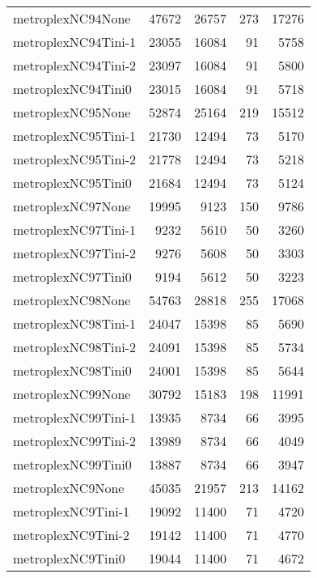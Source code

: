 \begin{longtable}{lrrrr}
metroplexNC94None & 47672 & 26757 & 273 & 17276 \\
metroplexNC94Tini-1 & 23055 & 16084 & 91 & 5758 \\
metroplexNC94Tini-2 & 23097 & 16084 & 91 & 5800 \\
metroplexNC94Tini0 & 23015 & 16084 & 91 & 5718 \\
metroplexNC95None & 52874 & 25164 & 219 & 15512 \\
metroplexNC95Tini-1 & 21730 & 12494 & 73 & 5170 \\
metroplexNC95Tini-2 & 21778 & 12494 & 73 & 5218 \\
metroplexNC95Tini0 & 21684 & 12494 & 73 & 5124 \\
metroplexNC97None & 19995 & 9123 & 150 & 9786 \\
metroplexNC97Tini-1 & 9232 & 5610 & 50 & 3260 \\
metroplexNC97Tini-2 & 9276 & 5608 & 50 & 3303 \\
metroplexNC97Tini0 & 9194 & 5612 & 50 & 3223 \\
metroplexNC98None & 54763 & 28818 & 255 & 17068 \\
metroplexNC98Tini-1 & 24047 & 15398 & 85 & 5690 \\
metroplexNC98Tini-2 & 24091 & 15398 & 85 & 5734 \\
metroplexNC98Tini0 & 24001 & 15398 & 85 & 5644 \\
metroplexNC99None & 30792 & 15183 & 198 & 11991 \\
metroplexNC99Tini-1 & 13935 & 8734 & 66 & 3995 \\
metroplexNC99Tini-2 & 13989 & 8734 & 66 & 4049 \\
metroplexNC99Tini0 & 13887 & 8734 & 66 & 3947 \\
metroplexNC9None & 45035 & 21957 & 213 & 14162 \\
metroplexNC9Tini-1 & 19092 & 11400 & 71 & 4720 \\
metroplexNC9Tini-2 & 19142 & 11400 & 71 & 4770 \\
metroplexNC9Tini0 & 19044 & 11400 & 71 & 4672 \\
\end{longtable}
